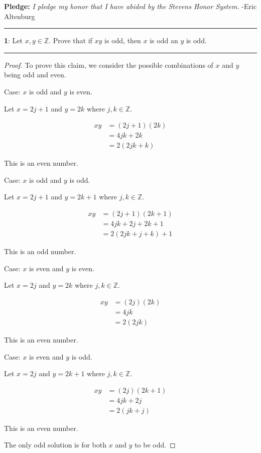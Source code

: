 \documentclass[11pt]{article}
\newcommand\question[2]{\vspace{.25in}\hrule\textbf{#1}: #2\vspace{.5em}\hrule\vspace{.10in}}
\newcommand{\Z}{\mathbb{Z}}
\begin{document}
\raggedright
\newcommand\NAME{Eric Altenburg}  %
\newcommand\COURSE{MA-240}
\newcommand\HWNUM{3}              %


\textbf{Pledge:} \textit{I pledge my honor that I have abided by the Stevens Honor System.} -Eric Altenburg

\question{1}{Let $x, y \in \Z$. Prove that if $xy$ is odd, then $x$ is odd an $y$ is odd.}

\begin{proof}
	To prove this claim, we consider the possible combinations of $x$ and $y$ being odd and even.

	Case: $x$ is odd and $y$ is even.

	Let $x = 2j+1$ and $y=2k$ where $j, k \in \Z$.

	\begin{align*}
		xy &= (2j+1)(2k)\\
		&= 4jk + 2k\\
		&= 2 (2jk + k)
	\end{align*}

	This is an even number.

	Case: $x$ is odd and $y$ is odd.

	Let $x = 2j+1$ and $y=2k+1$ where $j, k \in \Z$.

	\begin{align*}
		xy &= (2j+1)(2k+1)\\
		&= 4jk + 2j + 2k + 1\\
		&= 2 (2jk + j+k) + 1
	\end{align*}

	This is an odd number.

	Case: $x$ is even and $y$ is even.

	Let $x = 2j$ and $y=2k$ where $j, k \in \Z$.

	\begin{align*}
		xy &= (2j)(2k)\\
		&= 4jk\\
		&= 2 (2jk)
	\end{align*}

	This is an even number.

	Case: $x$ is even and $y$ is odd.

	Let $x = 2j$ and $y=2k+1$ where $j, k \in \Z$.

	\begin{align*}
		xy &= (2j)(2k+1)\\
		&= 4jk + 2j\\
		&= 2 (jk + j)
	\end{align*}

	This is an even number.

	The only odd solution is for both $x$ and $y$ to be odd.
\end{proof}
\end{document}
